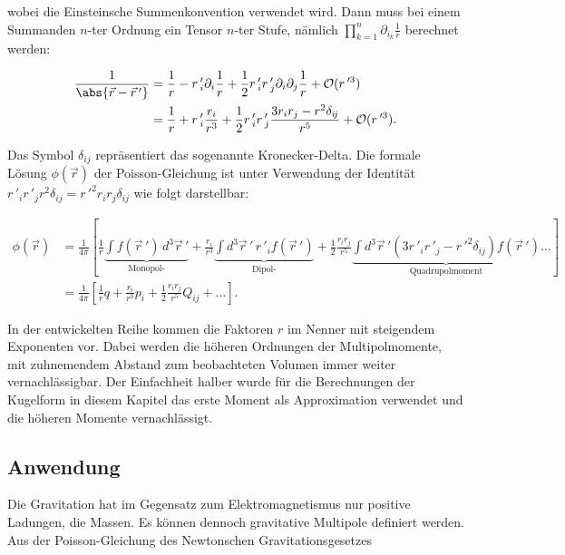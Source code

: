 \noindent
wobei die Einsteinsche Summenkonvention verwendet wird.
Dann muss bei einem Summanden \(n\)-ter Ordnung ein Tensor \(n\)-ter Stufe, nämlich \(\textstyle \prod_{k=1}^{n} \partial_{i_{k}} \frac{1}{r}\) berechnet werden:


\begin{align*}
\frac{1}{\abs{ \vec{r} - \vec{r}\,'}} &= \frac{1}{r} - r\,'_{i} \partial_{i} \frac{1}{r} + \frac{1}{2} r\,'_{i} r\,'_{j} \partial_{i} \partial_{j} \frac{1}{r} + \mathcal{O}(r\,'^{3}) \\
&= \frac{1}{r} + r\,'_{i} \frac{r_{i}}{r^{3}} + \frac{1}{2} r\,'_{i} r\,'_{j} \frac{3 r_{i} r_{j} - r^{2} \delta_{i\!j}}{r^{5}} + \mathcal{O}(r\,'^{3}).
\end{align*}


\noindent
Das Symbol \(\delta_{i\!j}\) repräsentiert das sogenannte Kronecker-Delta.
Die formale Lösung \(\phi (\vec{r})\) der Poisson-Gleichung ist unter Verwendung der Identität \(r\,'_{i} r\,'_{j} r^{2} \delta_{i\!j} = r\,'^{2} r_{i} r_{j} \delta_{i\!j}\) wie folgt darstellbar:


\begin{align*}
\phi (\vec{r}) &= \frac{1}{4\pi} \left[ \frac{1}{r} \underbrace{\int f (\vec{r}\,') \, d^3 \vec{r}\,'}_{\text{Monopol-}} + \frac{r_{i}}{r^{3}} \underbrace{\int d^3 \vec{r}\,' \, r\,'_{i} f (\vec{r}\,')}_{\text{Dipol-}} + \frac{1}{2} \frac{r_{i} r_{j}}{r^{5}} \underbrace{\int d^3 \vec{r}\,' \left( 3 r\,'_{i} r\,'_{j} - r\,'^{2} \delta_{i\!j} \right) f (\vec{r}\,')}_{\text{Quadrupolmoment}} \ldots \right] \\
&= \frac{1}{4\pi} \left[ \frac{1}{r} q + \frac{r_{i}}{r^{3}} p_{i} + \frac{1}{2} \frac{r_{i} r_{j}}{r^{5}} Q_{i\!j} + \ldots \right].
\end{align*}


In der entwickelten Reihe kommen die Faktoren \(r\) im Nenner mit steigendem Exponenten vor.
Dabei werden die höheren Ordnungen der Multipolmomente, mit zuhnemendem Abstand zum beobachteten Volumen immer weiter vernachlässigbar.
Der Einfachheit halber wurde für die Berechnungen der Kugelform in diesem Kapitel das erste Moment als Approximation verwendet und die höheren Momente vernachlässigt.



\subsection{Anwendung
\label{planet:subsection:anwendung}}

Die Gravitation hat im Gegensatz zum Elektromagnetismus nur positive Ladungen, die Massen.
Es können dennoch gravitative Multipole definiert werden.
Aus der Poisson-Gleichung des Newtonschen Gravitationsgesetzes


